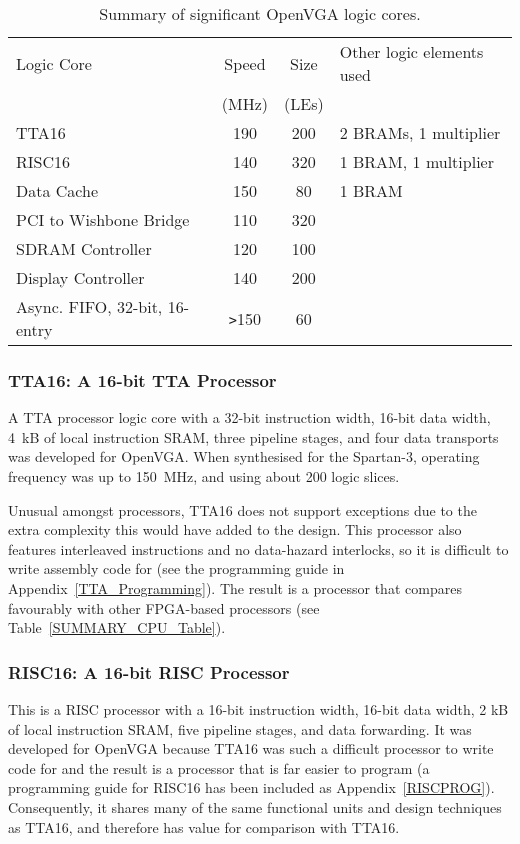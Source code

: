 \begin{table}[h!]
\begin{center}
\begin{tabular}{l | c c l}
Logic Core				& Speed	& Size	& Other logic elements used	\\
						& (MHz)	& (LEs)	&	\\
\hline
TTA16					& 190	& 200	& 2 BRAMs, 1 multiplier	\\
RISC16					& 140	& 320	& 1 BRAM, 1 multiplier	\\
Data Cache				& 150	& 80	& 1 BRAM	\\
PCI to Wishbone Bridge	& 110	& 320	&	\\
SDRAM Controller		& 120	& 100	&	\\
Display Controller		& 140	& 200	&	\\
Async. FIFO, 32-bit, 16-entry	& \texttt{>}150	& 60	&	\\
\end{tabular}
\caption[Summary of significant OpenVGA logic cores]{Summary of significant
OpenVGA logic cores.}
\label{SUMMARY_Cores}
\end{center}
\end{table}


\subsubsection{TTA16: A 16-bit TTA Processor}
A TTA processor logic core with a 32-bit instruction width, 16-bit data width,
4~kB of local instruction SRAM, three pipeline stages, and four data transports
was developed for OpenVGA. When synthesised for the Spartan-3, operating
frequency was up to 150~MHz, and using about 200 logic slices.

Unusual amongst processors, TTA16 does not support exceptions due to the extra
complexity this would have added to the design. This processor also features
interleaved instructions and no data-hazard interlocks, so it is difficult to
write assembly code for (see the programming guide in
Appendix~\ref{TTA_Programming}). The result is a processor that compares
favourably with other FPGA-based processors (see Table~\ref{SUMMARY_CPU_Table}).


\subsubsection{RISC16: A 16-bit RISC Processor}
This is a RISC processor with a 16-bit instruction width, 16-bit data width, 2 kB
of local instruction SRAM, five pipeline stages, and data forwarding. It was
developed for OpenVGA because TTA16 was such a difficult processor to write code
for and the result is a processor that is far easier to program (a programming
guide for RISC16 has been included as Appendix~\ref{RISCPROG}). Consequently, it
shares many of the same functional units and design techniques as TTA16, and
therefore has value for comparison with TTA16.

